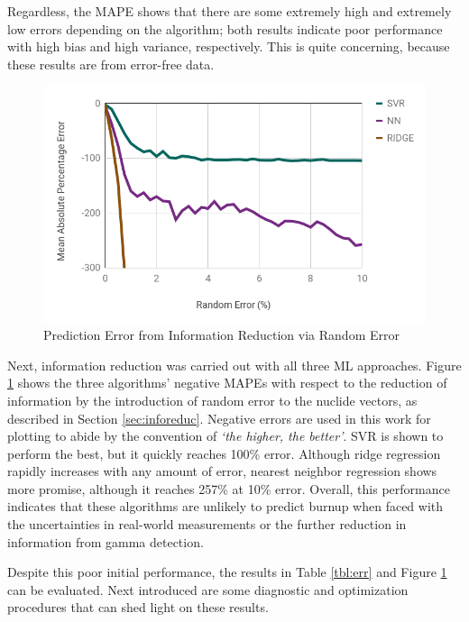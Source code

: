 Regardless, the \gls{MAPE} shows that there are some extremely high and
extremely low errors depending on the algorithm; both results indicate poor
performance with high bias and high variance, respectively.  This is quite
concerning, because these results are from error-free data.

\begin{figure}[!htb]
  \centering
  \includegraphics[width=\linewidth]{./chapters/method/randerr.png}
  \caption{Prediction Error from Information Reduction via Random Error}
  \label{fig:randerr}
\end{figure}

Next, information reduction was carried out with all three \gls{ML} approaches.
Figure \ref{fig:randerr} shows the three algorithms' negative \glspl{MAPE} with
respect to the reduction of information by the introduction of random error to
the nuclide vectors, as described in Section \ref{sec:inforeduc}. Negative
errors are used in this work for plotting to abide by the convention of
\textit{`the higher, the better'}.  \gls{SVR} is shown to perform the best, but
it quickly reaches 100\% error. Although ridge regression rapidly increases
with any amount of error, nearest neighbor regression shows more promise,
although it reaches 257\% at 10\% error.  Overall, this performance indicates
that these algorithms are unlikely to predict burnup when faced with the
uncertainties in real-world measurements or the further reduction in
information from gamma detection.

Despite this poor initial performance, the results in Table \ref{tbl:err} and
Figure \ref{fig:randerr} can be evaluated. Next introduced are some diagnostic
and optimization procedures that can shed light on these results.
